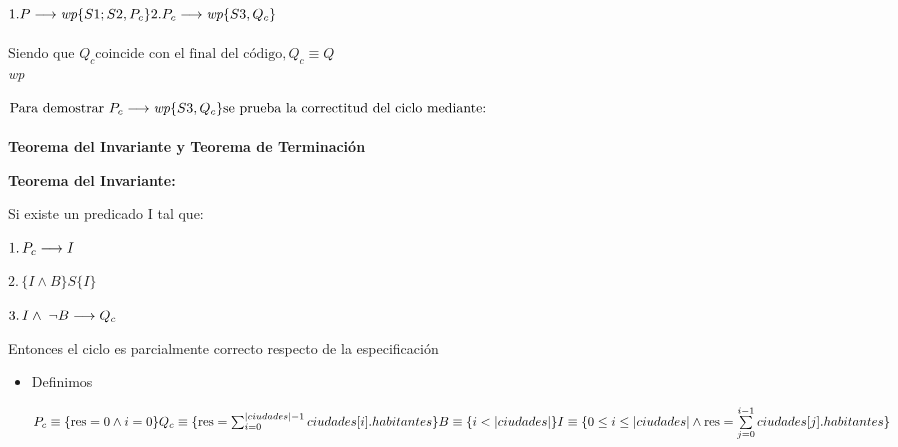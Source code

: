 \documentclass[10pt,a4paper]{article}
\begin{document}
\vspace{0.1cm}

 \\
\vspace {0.1cm} \\
$1. P \longrightarrow \textit{wp} \{S1;S2,P_{c}\} \\
	2. P_{c} \longrightarrow \textit{wp}\{S3,Q_{c}\}$ \\
\vspace {0.1cm} \\

$ \text{Siendo que } Q_{c}  \text{coincide con el final del código},  Q_{c} \equiv Q $\\
 \implica \textit{wp}

\vspace{0.3cm}

$\text{Para demostrar } P_{c} \longrightarrow \textit{wp} \{{S3,Q_{c}\}} \text{se prueba la correctitud del ciclo mediante:}$ \\
\vspace*{1cm} \\
\textbf{Teorema del Invariante y Teorema de Terminación}


\textbf{Teorema del Invariante:}

Si existe un predicado I tal que:

$1. \, P_{c} \longrightarrow I$

$2. \, \{I \wedge B\} S \{I\}$

$3. \, I \wedge \; \neg B \longrightarrow Q_{c}$

Entonces el ciclo es parcialmente correcto respecto de la especificación

\vspace{0.3cm}
\begin{itemize}

	\item{Definimos}

	      $P_{c}  \equiv \{ \text{res} = 0 \wedge i=0 \}           \\ \vspace{0.1cm} Q_{c}  \equiv
		      \{ \text{res} = \sum_{i=0}^{|ciudades|-1} ciudades[i].habitantes \} \\
		      \vspace{0.1cm} B  \equiv \{i < |ciudades| \}                       \\ \vspace{0.1cm} I  \equiv \{ 0
		      \leq i \leq |ciudades| \land \text{res} =
		      \sum\limits_{j=0}^{i-1}ciudades[j].habitantes \}$

\end{itemize}
\end{document}
